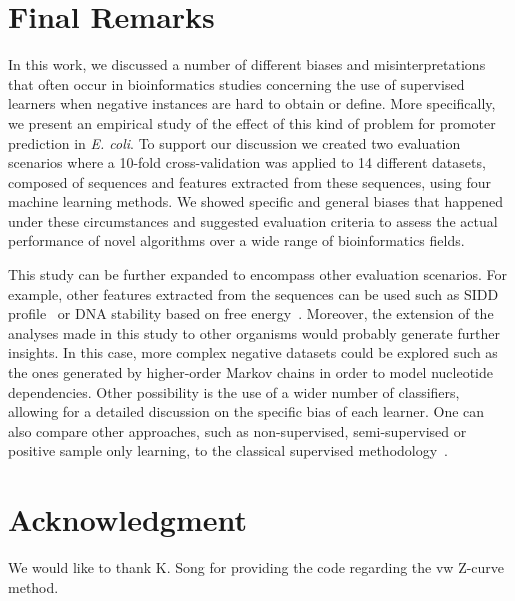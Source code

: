\documentclass[conference,letterpaper]{IEEEtran}
\begin{document}
\section{Final Remarks}
\label{sec:final}

In this work, we discussed a number of different biases and misinterpretations that often occur in bioinformatics studies concerning the use of supervised learners when negative instances are hard to obtain or define. More specifically, we present an empirical study of the effect of this kind of problem for promoter prediction in {\it E. coli}. To support our discussion we created two evaluation scenarios where a 10-fold cross-validation was applied to 14 different datasets, composed of sequences and features extracted from these sequences, using four machine learning methods. We showed specific and general biases that happened under these circumstances and suggested evaluation criteria to assess the actual performance of novel algorithms over a wide range of bioinformatics fields.

This study can be further expanded to encompass other evaluation scenarios. For example, other features extracted from the sequences can be used such as SIDD profile~\cite{bland2010} or DNA stability based on free energy~\cite{avila2011}. Moreover, the extension of the analyses made in this study to other organisms would probably generate further insights. In this case, more complex negative datasets could be explored such as the ones generated by higher-order Markov chains in order to model nucleotide dependencies. Other possibility is the use of a wider number of classifiers, allowing for a detailed discussion on the specific bias of each learner. One can also compare other approaches, such as non-supervised, semi-supervised or positive sample only learning, to the classical supervised methodology~\cite{cerulo2010,wang2006,yousef2008}.

\section*{Acknowledgment}
We would like to thank K. Song for providing the code regarding the vw Z-curve method.



\end{document}
